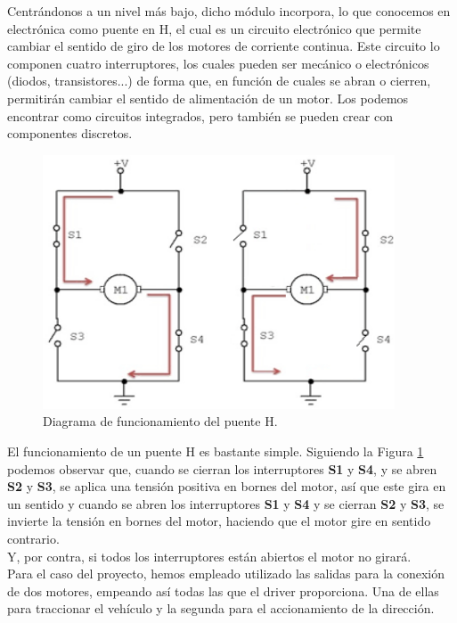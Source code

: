 Centrándonos a un nivel más bajo, dicho módulo incorpora, lo que conocemos en electrónica como puente en H, el cual es un circuito electrónico que permite cambiar el sentido de giro de los 
motores de corriente continua. Este circuito lo componen cuatro interruptores, los cuales pueden ser mecánico o electrónicos (diodos, transistores...) de forma que,
en función de cuales se abran o cierren, permitirán cambiar el sentido de alimentación de un motor.  Los podemos encontrar como circuitos integrados, pero también se
pueden crear con componentes discretos.\\

\begin{figure}[H]
  \begin{center}
    \includegraphics[scale=0.7]{imagenes/esquema_puente_h.png}
  \end{center}
  \caption{Diagrama de funcionamiento del puente H.}
  \label{esquema:funcionamiento_puente_h}
\end{figure}

El funcionamiento de un puente H es bastante simple. Siguiendo la Figura \ref{esquema:funcionamiento_puente_h} podemos observar que, cuando se cierran los interruptores \textbf{S1} y \textbf{S4}, y se abren \textbf{S2} y \textbf{S3}, se aplica una tensión positiva en bornes del motor, así 
que este gira en un sentido y cuando se abren los interruptores \textbf{S1} y \textbf{S4} y se cierran \textbf{S2} y \textbf{S3}, se invierte la tensión en bornes del motor, haciendo que el motor gire en sentido contrario.\\

Y, por contra, si todos los interruptores están abiertos el motor no girará. \\

Para el caso del proyecto, hemos empleado utilizado las salidas para la conexión de dos motores, empeando así todas las que el driver proporciona. Una de ellas para traccionar
el vehículo y la segunda para el accionamiento de la dirección.\\

